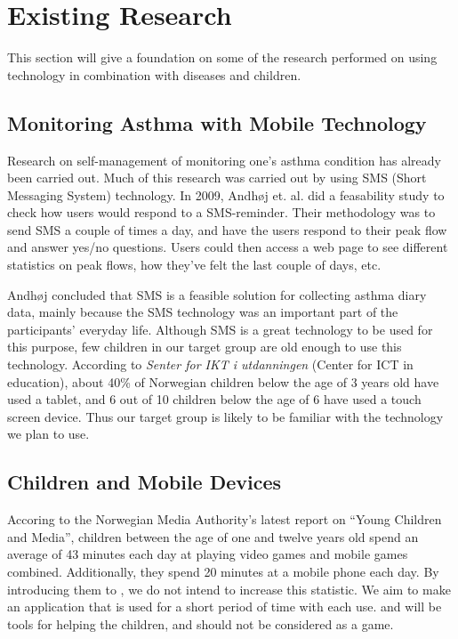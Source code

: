 \section{Existing Research}
\label{sec:existing-research}

This section will give a foundation on some of the research performed on using technology in combination with diseases and children. 


\subsection{Monitoring Asthma with Mobile Technology}
Research on self-management of monitoring one's asthma condition has already been carried out. Much of this research was carried out by using SMS (Short Messaging System) technology. In 2009, Andh\o j  et. al.\cite{anhoj2004feasibility} did a feasability study to check how users would respond to a SMS-reminder. Their methodology was to send SMS a couple of times a day, and have the users respond to their peak flow and answer yes/no questions. Users could then access a web page to see different statistics on peak flows, how they've felt the last couple of days, etc.

Andh\o j \etal{} concluded that SMS is a feasible solution for collecting asthma diary data, mainly because the SMS technology was an important part of the participants' everyday life. Although SMS is a great technology to be used for this purpose, few children in our target group are old enough to use this technology. According to \emph{Senter for IKT i utdanningen} (Center for ICT in education), about 40\% of Norwegian children below the age of 3 years old have used a tablet, and 6 out of 10 children below the age of 6 have used a touch screen device\cite{nrkchilduse}. Thus our target group is likely to be familiar with the technology we plan to use.  


\subsection{Children and Mobile Devices}

Accoring to the Norwegian Media Authority's latest report on ``Young Children and Media'', children between the age of one and twelve years old spend an average of 43 minutes each day at playing video games and mobile games combined\cite{medietilsynetbarn2014}. Additionally, they spend 20 minutes at a mobile phone each day. By introducing them to \app{}, we do not intend to increase this statistic. We aim to make an application that is used for a short period of time with each use. \app{} and \ab{} will be tools for helping the children, and should not be considered as a game.   

